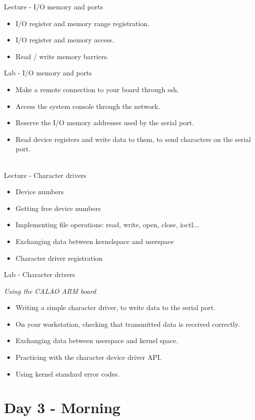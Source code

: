 \documentclass[a4paper,12pt,obeyspaces,spaces,hyphens]{article}
\begin{document}
\feagendatwocolumn
{Lecture - I/O memory and ports}
{
  \begin{itemize}
  \item I/O register and memory range registration.
  \item I/O register and memory access.
  \item Read / write memory barriers.
  \end{itemize}
}
{Lab - I/O memory and ports}
{
  \begin{itemize}
  \item Make a remote connection to your board through ssh.
  \item Access the system console through the network.
  \item Reserve the I/O memory addresses used by the serial port.
  \item Read device registers and write data to them, to send
    characters on the serial port.
  \end{itemize}
}
\\
\feagendatwocolumn
{Lecture - Character drivers}
{
  \begin{itemize}
  \item Device numbers
  \item Getting free device numbers
  \item Implementing file operations: read, write, open, close,
    ioctl...
  \item Exchanging data between kernelspace and userspace
  \item Character driver registration
  \end{itemize}
}
{Lab - Character drivers}
{
  {\em Using the CALAO ARM board}
  \begin{itemize}
  \item Writing a simple character driver, to write data to the serial port.
  \item On your workstation, checking that transmitted data is received correctly.
  \item Exchanging data between userspace and kernel space.
  \item Practicing with the character device driver API.
  \item Using kernel standard error codes.
  \end{itemize}
}

\section{Day 3 - Morning}
\end{document}
